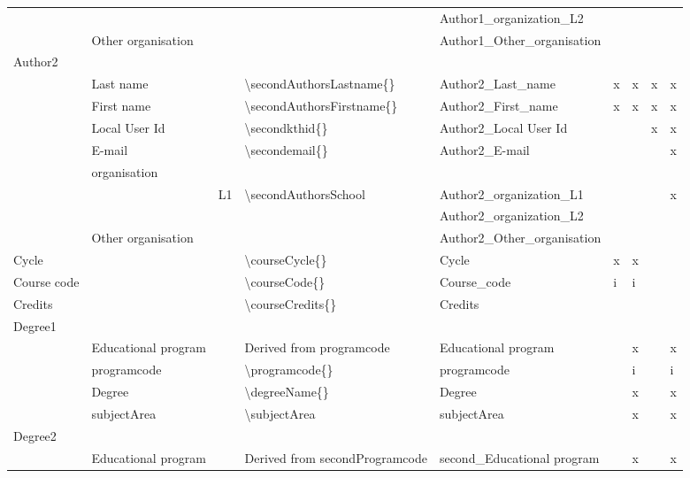 \begin{landscape}
{\begin{longtable}{L{2cm}|L{4cm}|l|L{4cm}|L{4cm}|l l l l|}
 &  &  &  & Author1\_organization\_L2 &  &  &  & \\
 & Other organisation &  &  & Author1\_Other\_organisation &  &  &  & \\
       \hline
{}Author2 & \\
 & Last name &  & \textbackslash secondAuthorsLastname\{\} & Author2\_Last\_name & x & x & x & x\\
 & First name &  & \textbackslash secondAuthorsFirstname\{\} & Author2\_First\_name & x & x & x & x\\
 & Local User Id &  & \textbackslash secondkthid\{\} & Author2\_Local User Id &  &  & x & x\\
 & E-mail &  & \textbackslash secondemail\{\} & Author2\_E-mail &  &  &  & x\\
 & organisation & \\ 
 &  & L1 & \textbackslash secondAuthorsSchool{ } & Author2\_organization\_L1 &  &  &  & x\\
 &  &  &  & Author2\_organization\_L2 &  &  &  & \\
 & Other organisation &  &  & Author2\_Other\_organisation &  &  &  & \\
       \hline
Cycle &  &  & \textbackslash courseCycle\{\} & Cycle & x & x &  & \\
Course code &  &  & \textbackslash courseCode\{\} & Course\_code & i & i &  &  \\
Credits &  &  & \textbackslash courseCredits\{\} & Credits &  &  &  & \\
      \hline
Degree1 & \\
 & Educational program &  & Derived from programcode & Educational program &  & x &  & x \\
 & programcode &  & \textbackslash programcode\{\} & programcode &  & i &  & i \\
 & Degree &  & \textbackslash degreeName\{\} & Degree &  & x &  & x \\
 & subjectArea &  & \textbackslash subjectArea{ } & subjectArea &  & x &  & x \\
Degree2 & \\
& Educational program &  & Derived from secondProgramcode & second\_Educational program &  & x &  & x \\

\end{longtable}}
\end{landscape}

